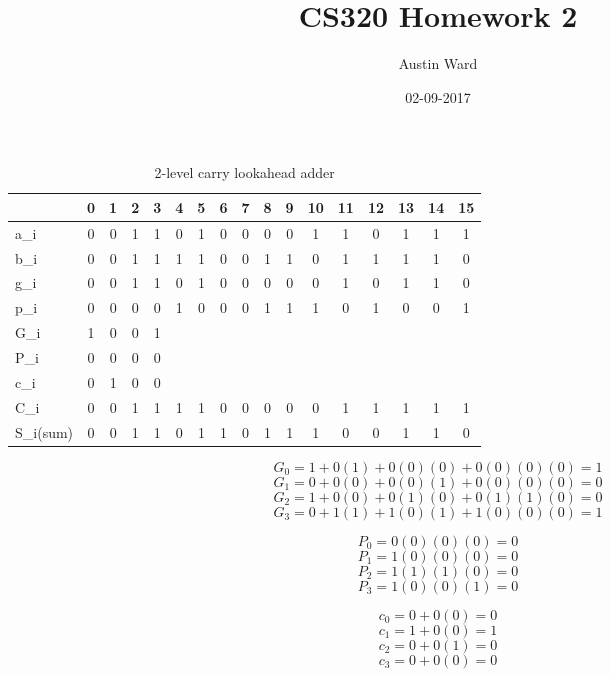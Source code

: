 \documentclass{article}
\title{CS320 Homework 2}
\date{02-09-2017}
\author{Austin Ward}
\begin{document}
\maketitle
{}
\begin{table}[h!]
  \centering
  \caption{2-level carry lookahead adder}
  \begin{tabular}{| l || c | c | c | c | c | c | c | c | c | c | c | c | c | c | c | c |}
    \toprule
    & 0 & 1 & 2 & 3 & 4 & 5 & 6 & 7 & 8 & 9 & {10} & {11} & {12} & {13} & {14} & {15}\\
    \midrule
    a_i & 0 & 0 & 1 & 1 & 0 & 1 & 0 & 0 & 0 & 0 & 1 & 1 & 0 & 1 & 1 & 1\\
    b_i & 0 & 0 & 1 & 1 & 1 & 1 & 0 & 0 & 1 & 1 & 0 & 1 & 1 & 1 & 1 & 0\\
    g_i & 0 & 0 & 1 & 1 & 0 & 1 & 0 & 0 & 0 & 0 & 0 & 1 & 0 & 1 & 1 & 0\\
    p_i & 0 & 0 & 0 & 0 & 1 & 0 & 0 & 0 & 1 & 1 & 1 & 0 & 1 & 0 & 0 & 1\\
    G_i & 1 & 0 & 0 & 1 &  &  &  &  &  &  &  &  & &  &  & \\
    P_i & 0 & 0 & 0 & 0 &  &  &  &  &  &  &  &  & &  &  & \\
    c_i & 0 & 1 & 0 & 0 &  &  &  &  &  &  &  &  & &  &  & \\
    C_i & 0 & 0 & 1 & 1 & 1 & 1 & 0 & 0 & 0 & 0 & 0 & 1 & 1 & 1 & 1 & 1\\
    S_{i(sum)} & 0 & 0 & 1 & 1 & 0 & 1 & 1 & 0 & 1 & 1 & 1 & 0 & 0 & 1 & 1 & 0\\
    \bottomrule
  \end{tabular}
\end{table}

\[ G_0 = 1 + 0(1) + 0(0)(0) + 0(0)(0)(0) = 1 \]
\[ G_1 = 0 + 0(0) + 0(0)(1) + 0(0)(0)(0) = 0 \]
\[ G_2 = 1 + 0(0) + 0(1)(0) + 0(1)(1)(0) = 0 \]
\[ G_3 = 0 + 1(1) + 1(0)(1) + 1(0)(0)(0) = 1 \]

\[ P_0 = 0(0)(0)(0) = 0 \]
\[ P_1 = 1(0)(0)(0) = 0 \]
\[ P_2 = 1(1)(1)(0) = 0 \]
\[ P_3 = 1(0)(0)(1) = 0 \]

\[ c_0 = 0 + 0(0) = 0 \]
\[ c_1 = 1 + 0(0) = 1 \]
\[ c_2 = 0 + 0(1) = 0 \]
\[ c_3 = 0 + 0(0) = 0 \]
\end{document}
